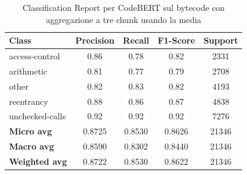 \documentclass[../../Thesis.tex]{subfiles}
\begin{document}
    \begin{table}[H]
        \centering
        \small
        \begin{tabular}{lcccc}
        \hline
        \textbf{Class} & \textbf{Precision} & \textbf{Recall} & \textbf{F1-Score} & \textbf{Support} \\
        \hline
        access-control & 0.86 & 0.78 & 0.82 & 2331 \\
        arithmetic & 0.81 & 0.77 & 0.79 & 2708 \\
        other & 0.82 & 0.83 & 0.82 & 4193 \\
        reentrancy & 0.88 & 0.86 & 0.87 & 4838 \\
        unchecked-calls & 0.92 & 0.92 & 0.92 & 7276 \\
        \hline
        \textbf{Micro avg} & 0.8725 & 0.8530 & 0.8626 & 21346 \\
        \textbf{Macro avg} & 0.8590 & 0.8302 & 0.8440 & 21346 \\
        \textbf{Weighted avg} & 0.8722 & 0.8530 & 0.8622 & 21346 \\
        \hline
        \end{tabular}
        \caption{Classification Report per CodeBERT sul bytecode con aggregazione a tre chunk usando la media}
    \end{table}
        
        
    
\end{document}
